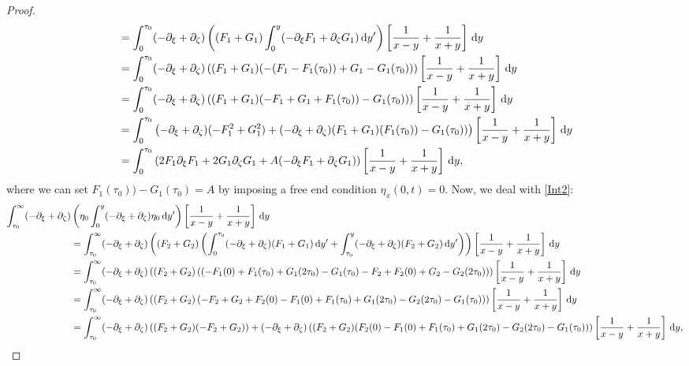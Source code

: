 \documentclass[10pt,reqno,oneside,a4paper, landscape]{article}
\begin{document}
\begin{proof}
\begin{align*}
&= \int_0^{\tau_0} (- \partial_\xi + \partial_\zeta)\left( (F_1 + G_1) \int^{y}_0 (-\partial_\xi F_1 + \partial_\zeta G_1) \,\mathrm{d} y' \right) \left[ \frac{1}{x-y} + \frac{1}{x+y} \right] \,\mathrm{d} y \\
&= \int_0^{\tau_0} (- \partial_\xi + \partial_\zeta)\left( (F_1 + G_1) (- (F_1-F_1(\tau_0)) + G_1 - G_1(\tau_0) )\right) \left[ \frac{1}{x-y} + \frac{1}{x+y} \right] \,\mathrm{d} y \\
&= \int_0^{\tau_0} (- \partial_\xi + \partial_\zeta)\left( (F_1 + G_1) ( - F_1 + G_1 + F_1(\tau_0) ) - G_1(\tau_0) )\right) \left[ \frac{1}{x-y} + \frac{1}{x+y} \right] \,\mathrm{d} y \\
&= \int_0^{\tau_0} \left(- \partial_\xi + \partial_\zeta) (-F_1^2 + G_1^2)  + (- \partial_\xi + \partial_\zeta)(F_1 + G_1) (F_1(\tau_0) ) - G_1(\tau_0) )\right) \left[ \frac{1}{x-y} + \frac{1}{x+y} \right] \,\mathrm{d} y \\
&= \int_0^{\tau_0} \left( 2 F_1  \partial_\xi F_1 + 2 G_1 \partial_\zeta G_1 + A(-\partial_\xi F_1 + \partial_\zeta G_1)\right) \left[ \frac{1}{x-y} + \frac{1}{x+y} \right] \,\mathrm{d} y, 
\end{align*}
where we can set $F_1(\tau_0) ) - G_1(\tau_0)  =  A$ by imposing a free end condition $\eta_x(0,t) = 0.$ Now, we deal with \eqref{Int2}:
\begin{align*}
\int_{\tau_0}^\infty (- \partial_\xi + \partial_\zeta)&\left( \eta_0 \int^{y}_0 (- \partial_\xi + \partial_\zeta)\eta_0 \D y' \right) \left[ \frac{1}{x-y} + \frac{1}{x+y} \right] \D y \\
&= \int_{\tau_0}^\infty  (- \partial_\xi + \partial_\zeta)\left( (F_2 + G_2) \left (\int^{\tau_0}_0 (- \partial_\xi + \partial_\zeta)(F_1 + G_1) \D y'  +  \int^{y}_{\tau_0} (- \partial_\xi + \partial_\zeta)(F_2 + G_2) \D y' \right) \right) \left[ \frac{1}{x-y} + \frac{1}{x+y} \right] \D y \\
&=  \int_{\tau_0}^\infty  (- \partial_\xi + \partial_\zeta)\left( (F_2 + G_2) \left( (- F_1(0) + F_1(\tau_0) + G_1(2\tau_0) - G_1(\tau_0)-  F_2 + F_2(0) + G_2 - G_2(2\tau_0) \right) \right) \left[ \frac{1}{x-y} + \frac{1}{x+y} \right] \D y \\
&=  \int_{\tau_0}^\infty  (- \partial_\xi + \partial_\zeta)\left( (F_2 + G_2) \left( - F_2 + G_2 + F_2(0) - F_1(0)  + F_1(\tau_0)  + G_1(2\tau_0) - G_2(2\tau_0) - G_1(\tau_0) \right) \right) \left[ \frac{1}{x-y} + \frac{1}{x+y} \right] \D y \\
&=  \int_{\tau_0}^\infty  (- \partial_\xi + \partial_\zeta)\left( (F_2 + G_2) (- F_2 + G_2) \right) +  (- \partial_\xi + \partial_\zeta)\left( (F_2 + G_2) (F_2(0) - F_1(0)  + F_1(\tau_0)  + G_1(2\tau_0) - G_2(2\tau_0) - G_1(\tau_0) ) \right) \left[ \frac{1}{x-y} + \frac{1}{x+y} \right] \D y,

\end{align*}
\end{proof}
\end{document}
